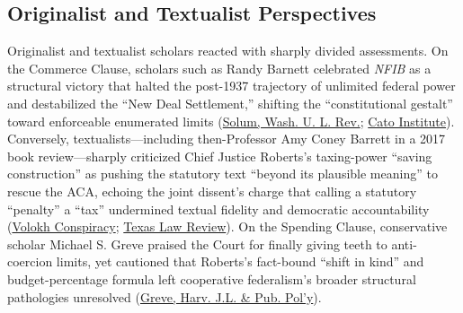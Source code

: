 \documentclass[12pt]{article}
\begin{document}
\subsection{Originalist and Textualist Perspectives}
Originalist and textualist scholars reacted with sharply divided assessments. On the Commerce Clause, scholars such as Randy Barnett celebrated \textit{NFIB} as a structural victory that halted the post-1937 trajectory of unlimited federal power and destabilized the ``New Deal Settlement,'' shifting the ``constitutional gestalt'' toward enforceable enumerated limits (\href{https://wustllawreview.org/wp-content/uploads/2021/10/91.1.1.pdf}{Solum, Wash. U. L. Rev.}; \href{https://www.cato.org/outside-articles/eastwood-talking-chair-good-bad-ugly-obamacare-ruling}{Cato Institute}). Conversely, textualists---including then-Professor Amy Coney Barrett in a 2017 book review---sharply criticized Chief Justice Roberts's taxing-power ``saving construction'' as pushing the statutory text ``beyond its plausible meaning'' to rescue the ACA, echoing the joint dissent's charge that calling a statutory ``penalty'' a ``tax'' undermined textual fidelity and democratic accountability (\href{https://reason.com/volokh/2020/09/26/what-did-professor-amy-coney-barrett-say-about-nfib-v-sebelius/}{Volokh Conspiracy}; \href{https://texaslawreview.org/facial-challenges-saving-constructions-and-statutory-severability/}{Texas Law Review}). On the Spending Clause, conservative scholar Michael S. Greve praised the Court for finally giving teeth to anti-coercion limits, yet cautioned that Roberts's fact-bound ``shift in kind'' and budget-percentage formula left cooperative federalism's broader structural pathologies unresolved (\href{https://journals.law.harvard.edu/jlpp/wp-content/uploads/sites/90/2014/01/37_1_83_Greve.pdf}{Greve, Harv. J.L. \& Pub. Pol'y}).
\end{document}
